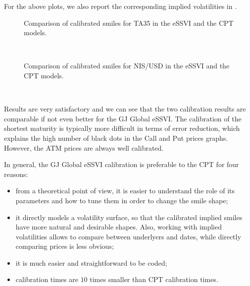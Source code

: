 \documentclass{article}
\providecommand{\tightlist}{%
      \setlength{\itemsep}{0pt}\setlength{\parskip}{0pt}}
\begin{document}
	For the above plots, we also report the corresponding implied
volatilities in .


    \begin{figure}
    	\caption{Comparison of calibrated smiles for TA35 in the eSSVI and the CPT models.}
    	\label{figIVTA35}
    \end{figure}
    { \hspace*{\fill} \\}


    \begin{figure}
    	\caption{Comparison of calibrated smiles for NIS/USD in the eSSVI and the CPT models.}
    	\label{figIVNISUSD}
    \end{figure}
    { \hspace*{\fill} \\}
    
	Results are very satisfactory and we can see that the two calibration
results are comparable if not even better for the GJ Global eSSVI. The
calibration of the shortest maturity is typically more difficult in
terms of error reduction, which explains the high number of black dots
in the Call and Put prices graphs. However, the ATM prices are always
well calibrated.

In general, the GJ Global eSSVI calibration is preferable to the CPT for
four reasons:

\begin{itemize}
\tightlist
\item
  from a theoretical point of view, it is easier to understand the role
  of its parameters and how to tune them in order to change the smile
  shape;
\item
  it directly models a volatility surface, so that the calibrated
  implied smiles have more natural and desirable shapes. Also, working
  with implied volatilities allows to compare between underlyers and
  dates, while directly comparing prices is less obvious;
\item
  it is much easier and straightforward to be coded;
\item
  calibration times are \(10\) times smaller than CPT calibration times.
\end{itemize}
\end{document}
